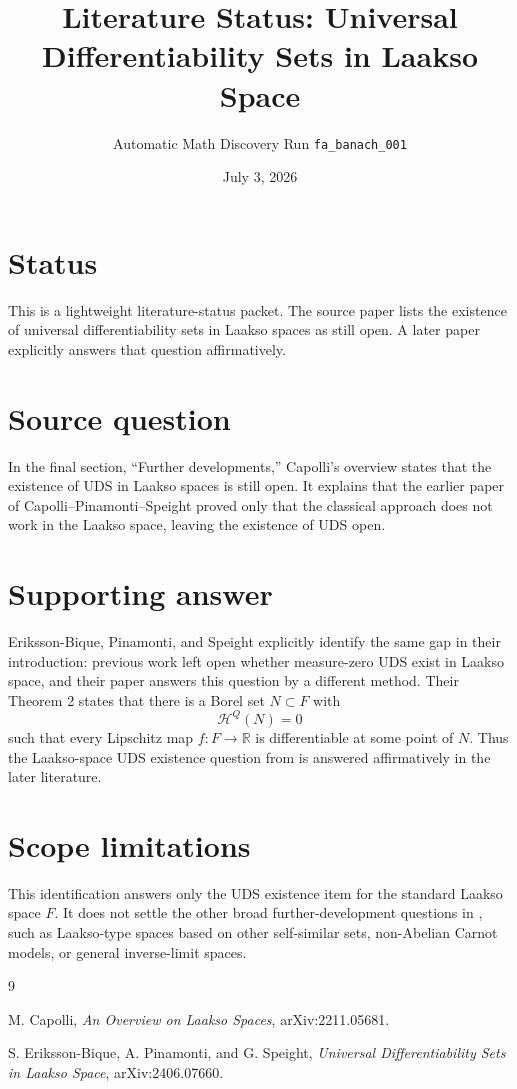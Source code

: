 \documentclass[11pt]{article}
\title{Literature Status: Universal Differentiability Sets in Laakso Space}
\author{Automatic Math Discovery Run \texttt{fa\_banach\_001}}
\date{July 3, 2026}
\begin{document}
\maketitle

\section*{Status}

This is a lightweight literature-status packet. The source paper
\cite{Capolli2022} lists the existence of universal differentiability sets
in Laakso spaces as still open. A later paper \cite{EBPS2024} explicitly
answers that question affirmatively.

\section*{Source question}

In the final section, ``Further developments,'' Capolli's overview
\cite{Capolli2022} states that the existence of UDS in Laakso spaces is still
open. It explains that the earlier paper of Capolli--Pinamonti--Speight
proved only that the classical approach does not work in the Laakso space,
leaving the existence of UDS open.

\section*{Supporting answer}

Eriksson-Bique, Pinamonti, and Speight \cite{EBPS2024} explicitly identify
the same gap in their introduction: previous work left open whether
measure-zero UDS exist in Laakso space, and their paper answers this
question by a different method. Their Theorem 2 states that there is a Borel
set \(N\subset F\) with
\[
        \mathcal H^Q(N)=0
\]
such that every Lipschitz map \(f:F\to\mathbb R\) is differentiable at some
point of \(N\). Thus the Laakso-space UDS existence question from
\cite{Capolli2022} is answered affirmatively in the later literature.

\section*{Scope limitations}

This identification answers only the UDS existence item for the standard
Laakso space \(F\). It does not settle the other broad further-development
questions in \cite{Capolli2022}, such as Laakso-type spaces based on other
self-similar sets, non-Abelian Carnot models, or general inverse-limit
spaces.

\begin{thebibliography}{9}

M. Capolli,
\emph{An Overview on Laakso Spaces},
arXiv:2211.05681.

S. Eriksson-Bique, A. Pinamonti, and G. Speight,
\emph{Universal Differentiability Sets in Laakso Space},
arXiv:2406.07660.

\end{thebibliography}
\end{document}
